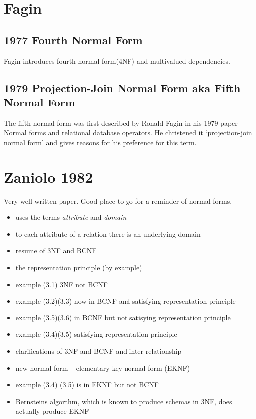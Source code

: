\documentclass[10pt,a4paper]{scrartcl}
\newcommand{\displaybibentry}[1]
{\begin{framed}
\bibentry{#1}
\end{framed}
}
\begin{document}
\section{Fagin}
\subsection{1977 Fourth Normal Form}
\displaybibentry{Fagin1977}
Fagin \cite{Fagin1977} introduces fourth normal form(4NF) and multivalued dependencies.

\subsection{1979 Projection-Join Normal Form aka Fifth Normal Form}
The fifth normal form was first described by Ronald Fagin in his 1979  paper Normal forms and relational database operators\cite{Fagin1979}. He christened it `projection-join normal form' and gives reasons for his preference for this term.

\section{Zaniolo 1982}
\displaybibentry{zaniolo1982}
Very well written paper. Good place to go for a reminder of normal forms.
\begin{itemize}
\item uses the terms \textit{attribute} and \textit{domain} 
\item to each attribute of a relation there is an underlying domain
\item resume of 3NF and BCNF
\item the representation principle (by example)
\item example (3.1) 3NF not BCNF
\item example (3.2)(3.3) now in BCNF and satisfying representation principle
\item example (3.5)(3.6) in BCNF but not satisying representation principle
\item example (3.4)(3.5) satisfying representation principle
\item clarifications of 3NF and BCNF and inter-relationship
\item new normal form -- elementary key normal form (EKNF)
\item example (3.4) (3.5) is in EKNF but not BCNF
\item Bernsteins algorthm, which is known to produce schemas in 3NF, does actually produce EKNF
\end{itemize}
\end{document}

